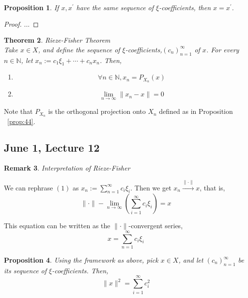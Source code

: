 \documentclass[11pt]{amsart}
\newtheorem{theorem}{Theorem}[section]
\newtheorem{proposition}[theorem]{Proposition}
\theoremstyle{definition}
\newtheorem{remark}[theorem]{Remark}
\numberwithin{equation}{section}
\newcommand{\bN}{ \mathbb{N} }	%
\begin{document}
\vspace{6pt}

\begin{proposition}\label{prop:53}
If $x, x^\prime$ have the same sequence of $\xi$-coefficients, then $x = x^\prime$. 
\end{proposition}

\begin{proof}
...
\end{proof}

\vspace{6pt}

\begin{theorem}\label{thm:54} \textit{Rieze-Fisher Theorem} \\
Take $x \in X$, and define the sequence of $\xi$-coefficients,$(c_n)^\infty_{n=1}$ of $x$. For every $n \in \bN$, let $x_n := c_1 \xi_1 + \cdots + c_n x_n$. Then, 
\begin{enumerate}
\item \[ \forall n \in \bN, x_n = P_{X_n}(x) \]
\item \[ \lim_{n\rightarrow \infty} \|x_n - x\| = 0\]
\end{enumerate}
\end{theorem}
Note that $P_{X_n}$ is the orthogonal projection onto $X_n$ defined as in Proposition ~\ref{prop:44}. 

\subsection{June 1, Lecture 12}

\begin{remark}\label{rem:55} \textit{Interpretation of Rieze-Fisher}

We can rephrase $(1)$ as $x_n := \sum_{n=1}^\infty c_i \xi_i$. Then we get $x_n \overset{\|\cdot\|}\longrightarrow x$, that is,
\[ \|\cdot\|-\lim_{n\rightarrow \infty} \left( \sum_{i=1}^\infty c_i \xi_i \right) = x\]

This equation can be written as the $\|\cdot\|$-convergent series, 
\[\label{eq:R-F} \tag{R-F} x = \sum_{n=1}^\infty c_i \xi_i \]
\end{remark}

\begin{proposition}\label{prop:56}
Using the framework as above, pick $x \in X$, and let $(c_n)^\infty_{n=1}$ be its sequence of $\xi$-coefficients. Then, 
\[ \label{eq:Parseval} \tag{Parseval} \|x\|^2 = \sum_{i=1}^\infty c_i^2\]
\end{proposition}
\end{document}

